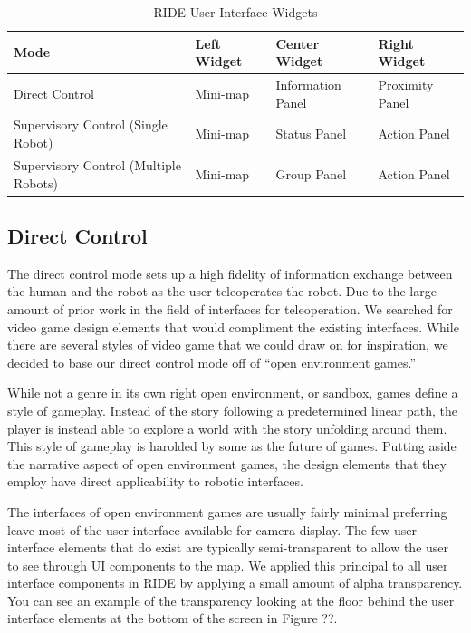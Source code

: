 \begin{table}[ht]
\label{tab:ui-widgets}
\begin{center}
    \begin{tabular}{ | p{4cm} | l | l | l |}
    \hline
    \textbf{Mode} & \textbf{Left Widget} & \textbf{Center Widget} & \textbf{Right Widget} \\ \hline
    Direct Control & Mini-map & Information Panel & Proximity Panel \\ \hline
    Supervisory Control (Single Robot) & Mini-map & Status Panel & Action Panel \\ \hline
    Supervisory Control (Multiple Robots) & Mini-map & Group Panel & Action Panel \\ \hline
    \hline
    \end{tabular}
    \caption{RIDE User Interface Widgets}
\end{center}
\end{table}

\subsection{Direct Control}

The direct control mode sets up a high fidelity of information exchange between the human and the robot as the user teleoperates the robot. Due to the large amount of prior work in the field of interfaces for teleoperation. We searched for video game design elements that would compliment the existing interfaces. While there are several styles of video game that we could draw on for inspiration, we decided to base our direct control mode off of ``open environment games.''

While not a genre in its own right open environment, or sandbox, games define a style of gameplay. Instead of the story following a predetermined linear path, the player is instead able to explore a world with the story unfolding around them. This style of gameplay is harolded by some as the future of games. Putting aside the narrative aspect of open environment games, the design elements that they employ have direct applicability to robotic interfaces.

The interfaces of open environment games are usually fairly minimal preferring leave most of the user interface available for camera display. The few user interface elements that do exist are typically semi-transparent to allow the user to see through UI components to the map. We applied this principal to all user interface components in RIDE by applying a small amount of alpha transparency. You can see an example of the transparency looking at the floor behind the user interface elements at the bottom of the screen in Figure ??. 

